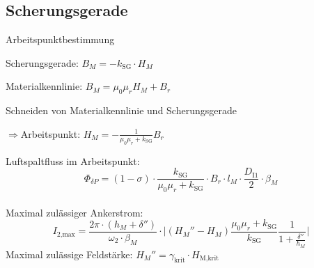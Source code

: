 \begin{sectionbox}
\subsection{Scherungsgerade}
\begin{cookbox}{Arbeitspunktbestimmung}
\item Scherungsgerade: $B_M = -k_\text{SG} \cdot H_M$
\item Materialkennlinie: $B_M = \mu_0 \mu_r H_M + B_r$
\item Schneiden von Materialkennlinie und Scherungsgerade
\item $\Rightarrow$Arbeitspunkt: $H_M = -\frac{1}{\mu_0 \mu_r + k_\text{SG}} B_r$
\end{cookbox}

Luftspaltfluss im Arbeitspunkt:\\
\[\Phi_{\delta P} = (1-\sigma)\cdot\frac{k_\text{SG}}{\mu_0 \mu_r + k_\text{SG}}\cdot B_r\cdot l_M\cdot\frac{D_\text{I1}}{2}\cdot\beta_M\]\\
Maximal zulässiger Ankerstrom:\\
\[I_\text{2,max} = \frac{2\pi\cdot (h_M+\delta'')}{\omega_2\cdot\beta_M} \cdot\Bigg\vert(H_M''-H_M) \frac{\mu_0\mu_r+k_\text{SG}}{k_\text{SG}}\frac{1}{1+\frac{\delta''}{h_M}}\Bigg\vert\]
Maximal zulässige Feldstärke: $H_M'' = \gamma_\text{krit} \cdot H_\text{M,krit}$
\end{sectionbox}
